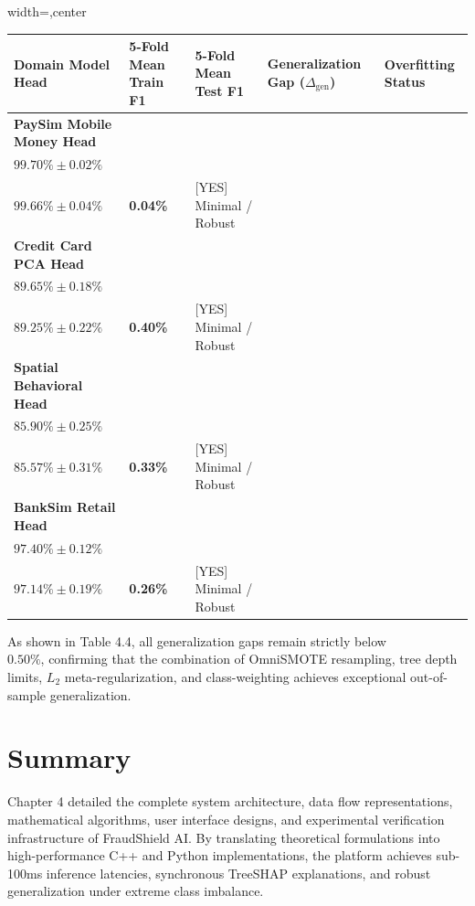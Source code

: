 \documentclass[12pt,a4paper,oneside]{report}
\begin{document}
\begin{table}[H]
\centering
\footnotesize
\begin{adjustbox}{width=\textwidth,center}
\begin{tabular}{| l | l | l | l | l |}
\hline
\rowcolor{tableheader} \textbf{Domain Model Head} & \textbf{5-Fold Mean Train F1} & \textbf{5-Fold Mean Test F1} & \textbf{Generalization Gap ($\Delta_{\text{gen}}$)} & \textbf{Overfitting Status} \\ \hline
\textbf{PaySim Mobile Money Head} & \\$99.70\% \pm 0.02\%$ & \\$99.66\% \pm 0.04\%$ & \textbf{0.04\%} & [YES] Minimal / Robust \\ \hline
\rowcolor{tablealt} \textbf{Credit Card PCA Head} & \\$89.65\% \pm 0.18\%$ & \\$89.25\% \pm 0.22\%$ & \textbf{0.40\%} & [YES] Minimal / Robust \\ \hline
\textbf{Spatial Behavioral Head} & \\$85.90\% \pm 0.25\%$ & \\$85.57\% \pm 0.31\%$ & \textbf{0.33\%} & [YES] Minimal / Robust \\ \hline
\rowcolor{tablealt} \textbf{BankSim Retail Head} & \\$97.40\% \pm 0.12\%$ & \\$97.14\% \pm 0.19\%$ & \textbf{0.26\%} & [YES] Minimal / Robust \\ \hline
\end{tabular}
\end{adjustbox}
\end{table}

As shown in Table 4.4, all generalization gaps remain strictly below \\$0.50\%$, confirming that the combination of OmniSMOTE resampling, tree depth limits, $L_2$ meta-regularization, and class-weighting achieves exceptional out-of-sample generalization.



\section{Summary}

Chapter 4 detailed the complete system architecture, data flow representations, mathematical algorithms, user interface designs, and experimental verification infrastructure of FraudShield AI. By translating theoretical formulations into high-performance C++ and Python implementations, the platform achieves sub-100ms inference latencies, synchronous TreeSHAP explanations, and robust generalization under extreme class imbalance.
\end{document}
